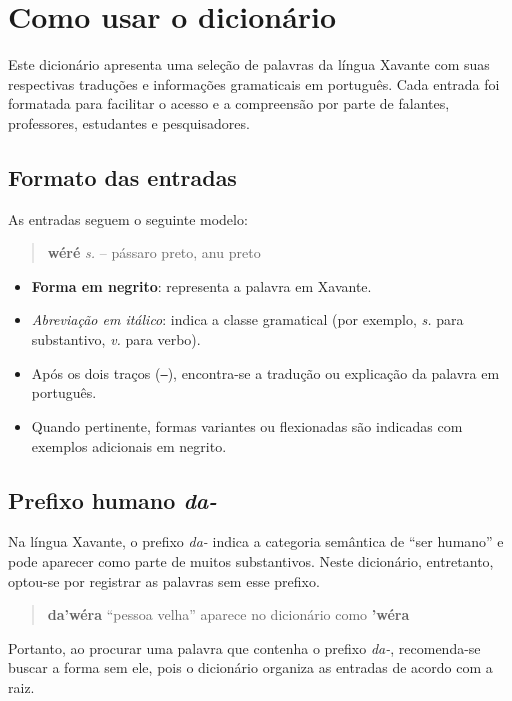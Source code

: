 \chapter*{Como usar o dicionário}

Este dicionário apresenta uma seleção de palavras da língua Xavante com suas respectivas traduções e informações gramaticais em português. Cada entrada foi formatada para facilitar o acesso e a compreensão por parte de falantes, professores, estudantes e pesquisadores.

\section*{Formato das entradas}

As entradas seguem o seguinte modelo:

\begin{quote}
\textbf{wéré} \textit{s.} -- pássaro preto, anu preto
\end{quote}

\begin{itemize}
  \item \textbf{Forma em negrito}: representa a palavra em Xavante.
  \item \textit{Abreviação em itálico}: indica a classe gramatical (por exemplo, \textit{s.} para substantivo, \textit{v.} para verbo).
  \item Após os dois traços (\texttt{--}), encontra-se a tradução ou explicação da palavra em português.
  \item Quando pertinente, formas variantes ou flexionadas são indicadas com exemplos adicionais em negrito.
\end{itemize}

\section*{Prefixo humano \textit{da-}}

Na língua Xavante, o prefixo \textit{da-} indica a categoria semântica de “ser humano” e pode aparecer como parte de muitos substantivos. Neste dicionário, entretanto, optou-se por registrar as palavras sem esse prefixo.

\begin{quote}
\textbf{da’wéra} “pessoa velha” aparece no dicionário como \textbf{’wéra}
\end{quote}

Portanto, ao procurar uma palavra que contenha o prefixo \textit{da-}, recomenda-se buscar a forma sem ele, pois o dicionário organiza as entradas de acordo com a raiz.


